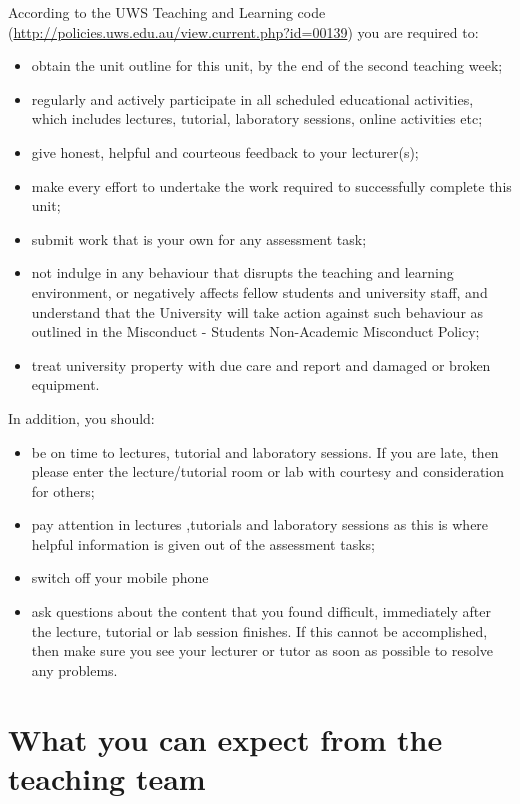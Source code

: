 \documentclass[a4paper,oneside]{book}
\begin{document}
According to the UWS Teaching and Learning code
(\url{http://policies.uws.edu.au/view.current.php?id=00139}) you are
required to:
\begin{itemize}
\item obtain the unit outline for this unit, by the end of the second
  teaching week;
\item regularly and actively participate in all scheduled educational
  activities, which includes lectures, tutorial, laboratory sessions,
  online activities etc;
\item give honest, helpful and courteous feedback to your lecturer(s);
\item make every effort to undertake the work required to successfully
  complete this unit;
\item submit work that is your own for any assessment task;
\item not indulge in any behaviour that disrupts the teaching and
  learning environment, or negatively affects fellow students and
  university staff, and understand that the University will take
  action against such behaviour as outlined in the Misconduct -
  Students Non-Academic Misconduct Policy;
\item treat university property with due care and report and damaged
  or broken equipment.
\end{itemize}
In addition, you should:
\begin{itemize}
\item be on time to lectures, tutorial and laboratory sessions.  If
  you are late, then please enter the lecture/tutorial room or lab
  with courtesy and consideration for others;
\item pay attention in lectures ,tutorials and laboratory sessions as
  this is where helpful information is given out of the assessment
  tasks;
\item switch off your mobile phone
\item ask questions about the content that you found difficult,
  immediately after the lecture, tutorial or lab session finishes.  If
  this cannot be accomplished, then make sure you see your lecturer or
  tutor as soon as possible to resolve any problems.
\end{itemize}

\section{What you can expect from the teaching team}
\end{document}
